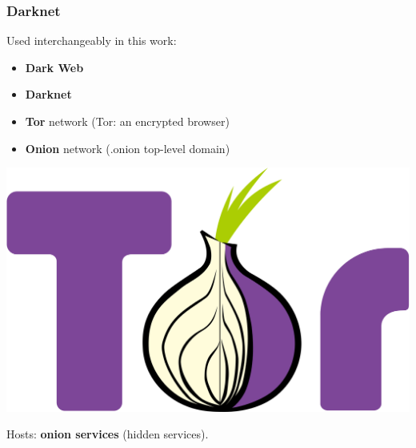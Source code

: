 \documentclass[t,xcolor={svgnames,table}]{beamer}
\begin{document}
{%
\begin{frame}
\end{frame}
}

\begin{frame}
	\frametitle{Darknet}
	
	Used interchangeably in this work:
	\vfill
	
	\begin{minipage}{.6\pagewidth}
	\begin{itemize}\setlength\itemsep{1em}
	\item \textbf{Dark Web}
	\item \textbf{Darknet}
	\item \textbf{Tor} network (Tor: an encrypted browser)
	\item \textbf{Onion} network (.onion top-level domain)
	\end{itemize}
	\end{minipage}
	\begin{minipage}{.3\pagewidth}
	\includegraphics[width=.3\pagewidth]{Tor.png}
	\end{minipage}
	\vfill
	
	Hosts: \textbf{onion services} (hidden services).
\end{frame}
\end{document}
